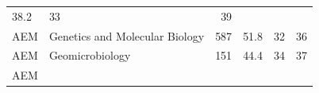 \documentclass[11pt,]{article}
\begin{document}
\begin{longtable}[]{@{}llrrrr@{}}
\begin{minipage}[t]{0.08\columnwidth}
38.2\strut
\end{minipage} & \begin{minipage}[t]{0.11\columnwidth}\raggedleft\strut
33\strut
\end{minipage} & \begin{minipage}[t]{0.11\columnwidth}\raggedleft\strut
39\strut
\end{minipage}\tabularnewline
\begin{minipage}[t]{0.06\columnwidth}\raggedright\strut
AEM\strut
\end{minipage} & \begin{minipage}[t]{0.43\columnwidth}\raggedright\strut
Genetics and Molecular Biology\strut
\end{minipage} & \begin{minipage}[t]{0.04\columnwidth}\raggedleft\strut
587\strut
\end{minipage} & \begin{minipage}[t]{0.08\columnwidth}\raggedleft\strut
51.8\strut
\end{minipage} & \begin{minipage}[t]{0.11\columnwidth}\raggedleft\strut
32\strut
\end{minipage} & \begin{minipage}[t]{0.11\columnwidth}\raggedleft\strut
36\strut
\end{minipage}\tabularnewline
\begin{minipage}[t]{0.06\columnwidth}\raggedright\strut
AEM\strut
\end{minipage} & \begin{minipage}[t]{0.43\columnwidth}\raggedright\strut
Geomicrobiology\strut
\end{minipage} & \begin{minipage}[t]{0.04\columnwidth}\raggedleft\strut
151\strut
\end{minipage} & \begin{minipage}[t]{0.08\columnwidth}\raggedleft\strut
44.4\strut
\end{minipage} & \begin{minipage}[t]{0.11\columnwidth}\raggedleft\strut
34\strut
\end{minipage} & \begin{minipage}[t]{0.11\columnwidth}\raggedleft\strut
37\strut
\end{minipage}\tabularnewline
\begin{minipage}[t]{0.06\columnwidth}\raggedright\strut
AEM\strut
\end{minipage} & \begin{minipage}[t]{0.43\columnwidth}\raggedright\strut

\end{minipage}
\end{longtable}
\end{document}
